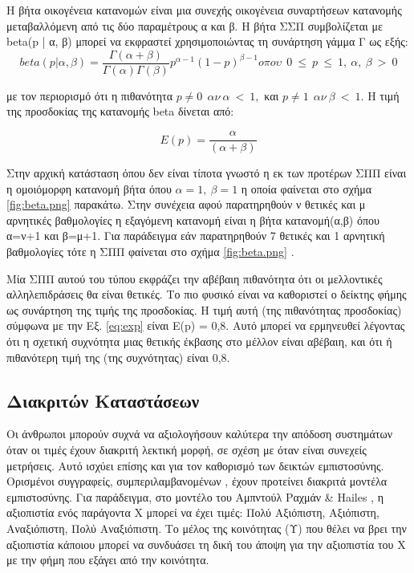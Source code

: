 Η βήτα οικογένεια κατανομών είναι μια συνεχής οικογένεια συναρτήσεων κατανομής μεταβαλλόμενη από τις δύο παραμέτρους α και β. Η βήτα ΣΣΠ συμβολίζεται με beta(p | α, β) μπορεί να εκφραστεί χρησιμοποιώντας τη συνάρτηση γάμμα Γ ως εξής:
\begin{equation}
beta(p|\alpha,\beta)= \frac{\Gamma\left(\alpha + \beta\right)}{\Gamma\left(\alpha\right)\Gamma\left(\beta\right)}p^{\alpha−1}\left(1-p\right)^{\beta-1} o \pi o \upsilon\ \  0\  ≤\  p\  ≤\  1,\  \alpha,\  \beta\  >\  0
\label{eq:beta}
\end{equation}

με τον περιορισμό ότι η πιθανότητα $ p \neq 0 \ \  \alpha \nu \  \alpha \  <\ 1,$ και $ p \neq 1 \ \  \alpha \nu \  \beta \  <\ 1$.
Η τιμή της προσδοκίας της κατανομής beta δίνεται από:

\begin{equation}
E\left(p\right) = \frac{\alpha}{\left(\alpha+\beta\right)}
\label{eq:exp}
\end{equation}

Στην αρχική κατάσταση όπου δεν είναι τίποτα γνωστό η εκ των προτέρων ΣΠΠ είναι η ομοιόμορφη κατανομή βήτα όπου $\alpha=1,\ \beta = 1$ η οποία φαίνεται στο σχήμα \ref{fig:beta.png}  παρακάτω. Στην συνέχεια αφού παρατηρηθούν ν θετικές και μ αρνητικές βαθμολογίες η εξαγόμενη κατανομή είναι η βήτα κατανομή(α,β) όπου α=ν+1 και β=μ+1. Για παράδειγμα εάν παρατηρηθούν 7 θετικές και 1 αρνητική βαθμολογίες τότε η ΣΠΠ φαίνεται στο σχήμα \ref{fig:beta.png} .


Μία ΣΠΠ αυτού του τύπου εκφράζει την αβέβαιη πιθανότητα ότι οι μελλοντικές αλληλεπιδράσεις θα είναι θετικές. Το πιο φυσικό είναι να καθοριστεί ο δείκτης φήμης ως συνάρτηση της τιμής της προσδοκίας. Η τιμή αυτή (της πιθανότητας προσδοκίας) σύμφωνα με την Εξ. \ref{eq:exp} είναι Ε(p) = 0,8. Αυτό μπορεί να ερμηνευθεί λέγοντας ότι η σχετική συχνότητα μιας θετικής έκβασης στο μέλλον είναι αβέβαιη, και ότι ή πιθανότερη τιμή της (της συχνότητας) είναι 0,8.

\subsection{ Διακριτών Καταστάσεων}
Οι άνθρωποι μπορούν συχνά να αξιολογήσουν καλύτερα την απόδοση συστημάτων όταν οι τιμές έχουν διακριτή λεκτική μορφή, σε σχέση με όταν είναι συνεχείς μετρήσεις. Αυτό ισχύει επίσης και για τον καθορισμό των δεικτών εμπιστοσύνης. Ορισμένοι συγγραφείς, συμπεριλαμβανομένων \cite{Abdul-Rahman}, 	\cite{Cahill} 
 έχουν προτείνει διακριτά μοντέλα εμπιστοσύνης. Για παράδειγμα, στο μοντέλο του Αμπντούλ Ραχμάν \& Hailes   \cite{Abdul-Rahman}
 , η αξιοπιστία ενός παράγοντα Χ μπορεί να έχει τιμές:
Πολύ Αξιόπιστη, Αξιόπιστη, Αναξιόπιστη, Πολύ Αναξιόπιστη.
Το μέλος της κοινότητας (Υ) που θέλει να βρει την αξιοπιστία κάποιου μπορεί να συνδυάσει τη δική του άποψη  για την αξιοπιστία του Χ με την φήμη που εξάγει από την κοινότητα.
 
